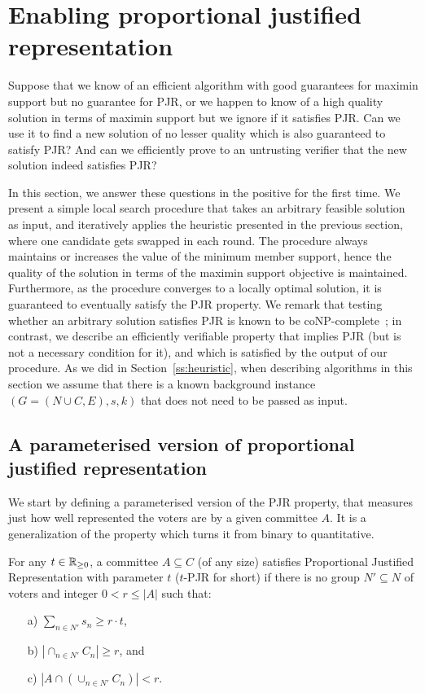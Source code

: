 \section{Enabling proportional justified representation}\label{s:local}

Suppose that we know of an efficient algorithm with good guarantees for maximin support but no guarantee for PJR, or we happen to know of a high quality solution in terms of maximin support but we ignore if it satisfies PJR. Can we use it to find a new solution of no lesser quality which is also guaranteed to satisfy PJR? And can we efficiently prove to an untrusting verifier that the new solution indeed satisfies PJR? 

In this section, we answer these questions in the positive for the first time. We present a simple local search procedure that takes an arbitrary feasible solution as input, and iteratively applies the heuristic presented in the previous section, where one candidate gets swapped in each round. The procedure always maintains or increases the value of the minimum member support, hence the quality of the solution in terms of the maximin support objective is maintained. Furthermore, as the procedure converges to a locally optimal solution, it is guaranteed to eventually satisfy the PJR property. 
We remark that testing whether an arbitrary solution satisfies PJR is known to be coNP-complete~\cite{aziz2018complexity}; in contrast, we describe an efficiently verifiable property that implies PJR (but is not a necessary condition for it), and which is satisfied by the output of our procedure.
As we did in Section~\ref{ss:heuristic}, when describing algorithms in this section we assume that there is a known background instance $(G=(N\cup C, E), s, k)$ that does not need to be passed as input.

\subsection{A parameterised version of proportional justified representation}

We start by defining a parameterised version of the PJR property, that measures just how well represented the voters are by a given committee $A$. It is a generalization of the property which turns it from binary to quantitative.

\begin{definition}
For any $t\in\mathbb{R}_{\geq 0}$, a committee $A\subseteq C$ (of any size) satisfies Proportional Justified Representation with parameter $t$ ($t$-PJR for short) if there is no group $N'\subseteq N$ of voters and integer $0<r\leq |A|$ such that:
\begin{itemize}
\item[a)] $\sum_{n\in N'} s_n \geq r\cdot t$,
\item[b)] $|\cap_{n\in N'} C_n|\geq r$, and
\item[c)] $|A\cap (\cup_{n\in N'} C_n)|<r$.
\end{itemize}
\end{definition}

